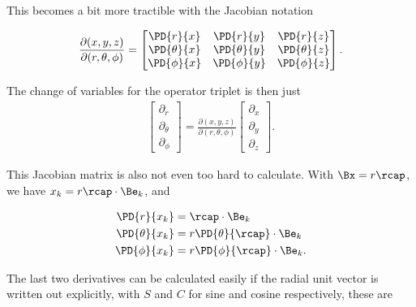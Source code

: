 This becomes a bit more tractible with the Jacobian notation

\begin{align}\label{eqn:jacobianSphericalPolar:3}
\frac{\partial (x,y,z)}{\partial (r,\theta,\phi)}
=
\begin{bmatrix}
\PD{r}{x} &\PD{r}{y} &\PD{r}{z}  \\
\PD{\theta}{x} &\PD{\theta}{y} &\PD{\theta}{z}  \\
\PD{\phi}{x} &\PD{\phi}{y} &\PD{\phi}{z}
\end{bmatrix}.
\end{align}

The change of variables for the operator triplet is then just
\begin{align}\label{eqn:jacobianSphericalPolar:4}
\begin{bmatrix}
\partial_r \\
\partial_\theta \\
\partial_\phi
\end{bmatrix}
= 
\frac{\partial (x,y,z)}{\partial (r,\theta,\phi)}
\begin{bmatrix}
\partial_x \\
\partial_y \\
\partial_z
\end{bmatrix}.
\end{align}

This Jacobian matrix is also not even too hard to calculate.  With $\Bx = r \rcap$, we have $x_k = r \rcap \cdot \Be_k$, and

\begin{subequations}
\begin{align}\label{eqn:jacobianSphericalPolar:5}
\PD{r}{x_k} &= \rcap \cdot \Be_k \\
\PD{\theta}{x_k} &= r \PD{\theta}{\rcap} \cdot \Be_k \\
\PD{\phi}{x_k} &= r \PD{\phi}{\rcap} \cdot \Be_k.
\end{align}
\end{subequations}

The last two derivatives can be calculated easily if the radial unit vector is written out explicitly, with $S$ and $C$ for sine and cosine respectively, these are

